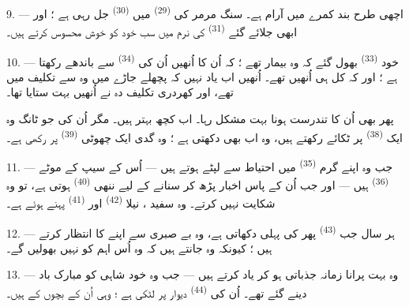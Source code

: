 9. --- اچھی طرح بند کمرے میں آرام ہے۔ سنگ مرمر کی 
\textsuperscript{(29)} میں 
\textsuperscript{(30)} جل رہی ہے ؛ اور ابھی جلائے گئے 
\textsuperscript{(31)} کی نرم  میں سب خود کو خوش محسوس
کرتے ہیں۔

\VUsaut{4.2mm}
\VUsaut{3.0mm}

10. --- خود  \textsuperscript{(33)} بھول گئے کہ وہ بیمار
تھے ؛ کہ اُن کا  اُنھیں اُن کی  \textsuperscript{(34)} سے باندھے رکھتا ہے ؛ اور کہ کل ہی اُنھیں
 تھے۔ اُنھیں اب یاد نہیں کہ پچھلے جاڑے میں وہ
 سے تکلیف میں تھے، اور کھردری تکلیف دہ 
نے اُنھیں بہت ستایا تھا۔

پھر بھی اُن کا تندرست ہونا بہت مشکل رہا۔ اب کچھ بہتر ہیں۔ مگر اُن کی
جو ٹانگ وہ ایک  \textsuperscript{(38)} پر ٹکائے رکھتے ہیں،
وہ اب بھی دکھتی ہے ؛ وہ گدی ایک چھوٹی 
\textsuperscript{(39)} پر رکھی ہے۔

11. --- جب وہ اپنے گرم  \textsuperscript{(35)} میں
احتیاط سے لپٹے ہوتے ہیں — اُس کے سیپ کے موٹے 
\textsuperscript{(36)} ہیں — اور جب اُن کے پاس اخبار پڑھ کر سنانے کے
لیے ننھی  \textsuperscript{(40)} ہوتی ہے، تو وہ
شکایت نہیں کرتے۔ وہ سفید ، نیلا 
\textsuperscript{(42)} اور  \textsuperscript{(41)}
پہنے ہوئے ہے۔

12. --- ہر سال جب  \textsuperscript{(43)} پھر
 کی پہلی  دکھاتی ہے، وہ بے صبری سے اپنے
 کا انتظار کرتے ہیں ؛ کیونکہ وہ جانتے ہیں کہ وہ
اُس اہم  کو نہیں بھولیں گے۔

13. --- وہ بہت پرانا زمانہ جذباتی ہو کر یاد کرتے ہیں — جب وہ خود
شاہی  کو مبارک باد دینے گئے تھے۔ اُن کی
 \textsuperscript{(44)} دیوار پر لٹکی ہے ؛ وہی اُن کے
بچوں کے  ہیں۔

\VUsaut{6.0mm}
\VUfilet{22mm}
